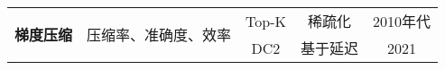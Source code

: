 \begin{table}[htbp]
{\begin{tabular}{@{}ccccc@{}}
\multirow{2}{*}{\textbf{梯度压缩}}         & \multirow{2}{*}{压缩率、准确度、效率}                            & Top-K             & 稀疏化           & 2010年代        \\
                                                    
                                                       &                                              & DC2 \cite{abdelmoniem2021dc2}             & 基于延迟    &   2021            \\ \bottomrule
\end{tabular}
}
\label{table_task_algo}
\end{table}
